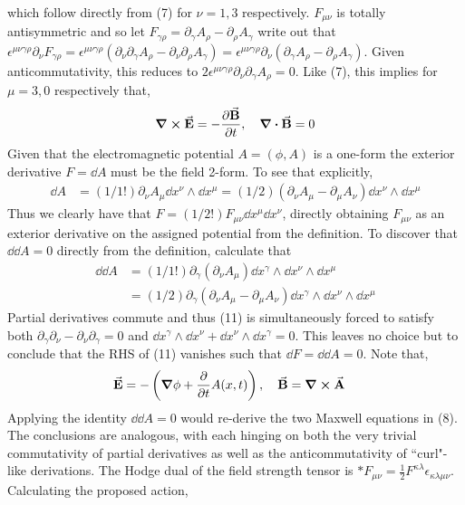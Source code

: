\documentclass[10pt]{scrartcl}
\begin{document}
which follow directly from (7) for $\nu = 1, 3$ respectively. $F_{\mu\nu}$ is totally antisymmetric and so let $F_{\gamma\rho} = \partial_{\gamma}A_{\rho} - \partial_{\rho}A_{\gamma}$ write out that $\epsilon^{\mu\nu\gamma\rho}\partial_{\nu}F_{\gamma\rho} = 	\epsilon^{\mu\nu\gamma\rho}(\partial_\nu \partial_\gamma A_\rho - \partial_\nu\partial_\rho A_\gamma) = \epsilon^{\mu\nu\gamma\rho}\partial_\nu (\partial_\gamma A_\rho - \partial_\rho A_\gamma)$. Given anticommutativity, this reduces to $2\epsilon^{\mu\nu\gamma\rho}\partial_\nu\partial_\gamma A_\rho = 0$. Like (7), this implies for $\mu=3, 0$ respectively that,
\begin{align}
\curl{\va{E}} = -\pdv{\va{B}}{t} \qc \div{\va{B}} = 0	
\end{align}
Given that the electromagnetic potential $A=(\phi, A)$ is a one-form the exterior derivative $F=\dd{A}$ must be the field 2-form. To see that explicitly,
\begin{align}
\dd{A} &= (1/1!)\partial_\nu A_\mu \dd{x}^{\nu}\wedge\dd{x}^{\mu}	= (1/2)(\partial_\nu A_\mu - \partial_\mu A_\nu)\dd{x}^\nu \wedge \dd{x}^\mu 
\end{align}
Thus we clearly have that $F = (1/2!)F_{\mu\nu}\dd{x}^{\mu}\dd{x}^{\nu}$, directly obtaining $F_{\mu\nu}$ as an exterior derivative on the assigned potential from the definition. To discover that $\dd{\dd{A}}=0$ directly from the definition, calculate that
\begin{align}
\dd{\dd{A}} &=(1/1!)\partial_\gamma(\partial_\nu A_\mu)\dd{x}^{\gamma}\wedge\dd{x}^{\nu}\wedge\dd{x}^\mu \\ &=(1/2)\partial_\gamma(\partial_\nu A_\mu - \partial_\mu A_\nu)\dd{x}^{\gamma}\wedge\dd{x}^{\nu}\wedge\dd{x}^\mu 
\end{align}
Partial derivatives commute and thus (11) is simultaneously forced to satisfy both $\partial_{\gamma}\partial_{\nu}-\partial_{\nu}\partial_{\gamma} = 0$ and $\dd{x}^{\gamma}\wedge\dd{x}^{\nu} + \dd{x}^{\nu}\wedge\dd{x}^{\gamma} = 0$. This leaves no choice but to conclude that the RHS of (11) vanishes such that $\dd{F} = \dd{\dd{A}} = 0$. Note that,
\begin{align}
\va{E} &= -\left(\grad{\phi} + \pdv{t}A(x, t)\right)\qc \va{B} = \curl{\va{A}}	
\end{align}
Applying the identity $\dd{\dd{A}}=0$ would re-derive the two Maxwell equations in (8). The conclusions are analogous, with each hinging on both the very trivial commutativity of partial derivatives as well as the anticommutativity of ``curl"-like derivations.  The Hodge dual of the field strength tensor is $\ast F_{\mu\nu} = \frac{1}{2} F^{\kappa\lambda}\epsilon_{\kappa\lambda\mu\nu}$. Calculating the proposed action, 
\end{document}
